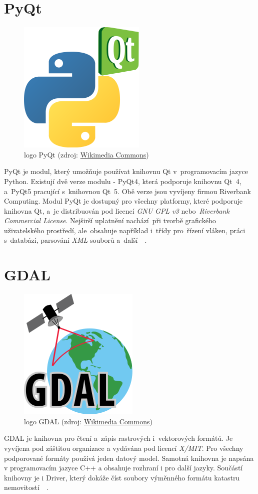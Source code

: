 \section{PyQt}
\label{pyqt}

	\begin{figure}[H]
		\centering
		\includegraphics[width=.2\textwidth]{./pictures/pyqt_logo.png}
      	\caption[logo PyQt]{logo PyQt (zdroj: \href{https://commons.wikimedia.org/wiki/File:Python_and_Qt.svg}{Wikimedia Commons})}
		\label{fig:pyqt_logo}
 	\end{figure}

PyQt je modul, který umožňuje používat knihovnu Qt v~programovacím jazyce Python. Existují dvě verze modulu - PyQt4, která podporuje knihovnu Qt~4, a~PyQt5 pracující s~knihovnou Qt~5. Obě verze jsou vyvíjeny firmou Riverbank Computing. Modul PyQt je dostupný pro všechny platformy, které podporuje knihovna Qt, a~je distribuován pod licencí \textit{GNU GPL v3} nebo~\textit{Riverbank Commercial License}. Nejširší uplatnění nachází~při tvorbě grafického uživatelského prostředí, ale~obsahuje například i~třídy pro~řízení vláken, práci s~databází, parsování \textit{XML} souborů a~další~\citep{pyqt}~\citep{wiki_pyqt}.

\section{GDAL}
\label{gdal}

	\begin{figure}[H]
		\centering
		\includegraphics[width=.2\textwidth]{./pictures/gdal_logo.png}
      	\caption[logo GDAL]{logo GDAL (zdroj: \href{https://commons.wikimedia.org/wiki/File:GDALLogoColor.svg}{Wikimedia Commons})}
		\label{fig:gdal_logo}
 	\end{figure}

GDAL je knihovna pro čtení a~zápis rastrových i~vektorových  formátů. Je vyvíjena pod záštitou organizace  a vydávána pod licencí \textit{X/MIT}. Pro všechny podporované formáty používá jeden datový model. Samotná knihovna je napsána v programovacím jazyce C++ a obsahuje rozhraní i pro další jazyky. Součástí knihovny je i  Driver, který dokáže číst soubory výměnného formátu katastru nemovitostí~\citep{gdal}~\citep{wiki_gdal}.

